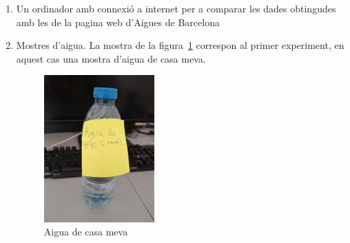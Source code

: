 \begin{enumerate}
 \item Un ordinador amb connexió a internet per a comparar les dades obtingudes amb les de la pagina web d'Aigues de Barcelona \cite{qualitatAigua}

 \item Mostres d'aigua. La mostra de la figura~\ref{fig:fotoAiguaCasaMeva} correspon al primer experiment, en aquest cas una mostra d'aigua de casa meva.
 \begin{figure}[h!]
    \centering
    \includegraphics[width=0.4\textwidth, angle=270]{./Figures/aguadecasa.png}
    \caption{Aigua de casa meva}
    \label{fig:fotoAiguaCasaMeva}
  \end{figure}
\end{enumerate}






%
